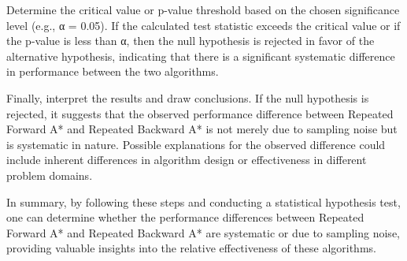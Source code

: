 Determine the critical value or p-value threshold based on the chosen significance level (e.g., α = 0.05). If the calculated test statistic exceeds the critical value or if the p-value is less than α, then the null hypothesis is rejected in favor of the alternative hypothesis, indicating that there is a significant systematic difference in performance between the two algorithms.

Finally, interpret the results and draw conclusions. If the null hypothesis is rejected, it suggests that the observed performance difference between Repeated Forward A* and Repeated Backward A* is not merely due to sampling noise but is systematic in nature. Possible explanations for the observed difference could include inherent differences in algorithm design or effectiveness in different problem domains.

In summary, by following these steps and conducting a statistical hypothesis test, one can determine whether the performance differences between Repeated Forward A* and Repeated Backward A* are systematic or due to sampling noise, providing valuable insights into the relative effectiveness of these algorithms.
